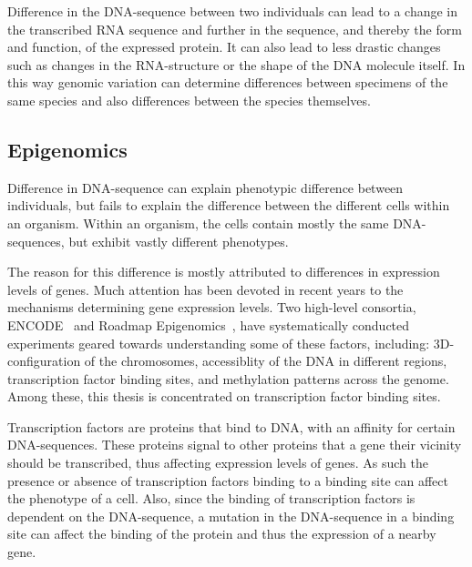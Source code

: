 Difference in the DNA-sequence between two individuals can lead to a change in the transcribed RNA sequence and further in the sequence, and thereby the form and function, of the expressed protein.
It can also lead to less drastic changes such as changes in the RNA-structure or the shape of the DNA molecule itself.
In this way genomic variation can determine differences between specimens of the same species and also differences between the species themselves.

\subsection{Epigenomics}
Difference in DNA-sequence can explain phenotypic
difference between individuals, but fails to explain the difference between the different cells within an organism.
Within an organism, the cells contain mostly the same DNA-sequences, but exhibit vastly different phenotypes.

The reason for this difference is mostly attributed to differences in expression levels of genes.
Much attention has been devoted in recent years to the mechanisms determining gene expression levels.
Two high-level consortia, ENCODE~\cite{encode} and Roadmap Epigenomics~\cite{roadmap}, have systematically conducted experiments geared towards understanding some of these factors, including: 3D-configuration of the chromosomes, accessiblity of the DNA in different regions, transcription factor binding sites, and methylation patterns across the genome.
Among these, this thesis is concentrated on transcription factor binding sites.

Transcription factors are proteins that bind to DNA, with an affinity for certain DNA-sequences.
These proteins signal to other proteins that a gene their vicinity should be transcribed, thus affecting expression levels of genes.
As such the presence or absence of transcription factors binding to a binding site can affect the phenotype of a cell.
Also, since the binding of transcription factors is dependent on the DNA-sequence, a mutation in the DNA-sequence in a binding site can affect the binding of the protein and thus the expression of a nearby gene. 

